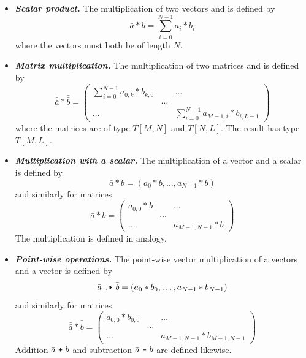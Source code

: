 \begin{itemize}
\item \textbf{\textit{Scalar product.}} The multiplication  of two vectors  and  is defined by
%
$$\bar{a} * \bar{b} = \sum_{i=0}^{N-1} a_{i} *  b_{i}$$
%
where the vectors must both be of length $N$. 

\item \textbf{\textit{Matrix multiplication.}} The multiplication  of two matrices  and  is defined by
%
\[\bar{\bar{a}} * \bar{\bar{b}} =
\left(
\begin{array}{ccc}
\sum_{i=0}^{N-1} a_{0,k} *  b_{k,0}  &   &  \ldots \\
 &  \ldots &  \\
\ldots  &  &  \sum_{i=0}^{N-1} a_{M-1,i} *  b_{i,L-1} 
\end{array}
\right)
\]
%
where the matrices are of type $T[M,N]$ and $T[N,L]$. The result has type $T[M,L]$.

\item \textbf{\textit{Multiplication with a scalar.}} The multiplication 
of a vector  and a scalar  is defined by
%
$$\bar{a} * b =  (a_{0} *  b, \ldots , a_{N-1} *  b)$$
%
and similarly for matrices
%
\[\bar{\bar{a}} * b =
\left(
\begin{array}{ccc}
a_{0,0} *  b  &   &  \ldots \\
 &  \ldots &  \\
\ldots  &  &  a_{M-1,N-1} *  b 
\end{array}
\right)
\]
%
The multiplication  is defined in analogy.

\item \textbf{\textit{Point-wise operations.}} The point-wise vector multiplication 
 of a vectors  and a vector  is defined by
%
$$\bar{a}\ \texttt{\small{.*}}\ \bar{b} =  (a_{0} *  b_{0}, \ldots , a_{N-1} *  b_{N-1})$$
%
and similarly for matrices
%
\[\bar{\bar{a}} * \bar{\bar{b}} =
\left(
\begin{array}{ccc}
a_{0,0} *  b_{0,0}  &   &  \ldots \\
 &  \ldots &  \\
\ldots  &  &  a_{M-1,N-1} *  b_{M-1,N-1} 
\end{array}
\right)
\]
%
Addition $\bar{a}\ \texttt{\small{+}}\ \bar{b}$ and subtraction $\bar{a}\ \texttt{\small{-}}\ \bar{b}$ are defined  likewise.


\end{itemize}
